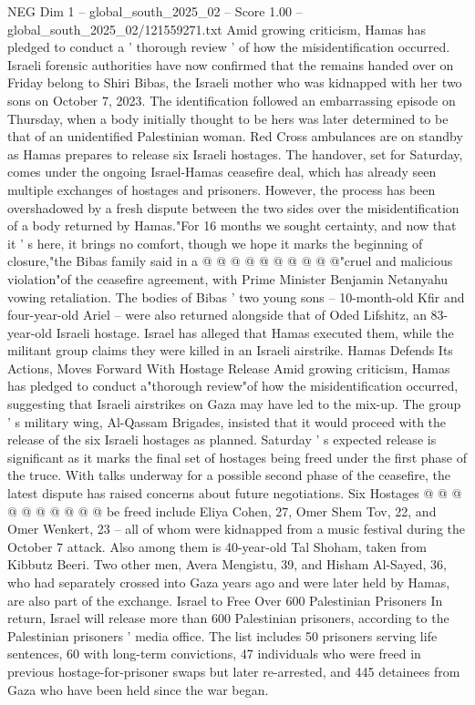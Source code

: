 \begin{textsample}{NEG Dim 1 – global\_south\_2025\_02 – Score 1.00 – global\_south\_2025\_02/121559271.txt}  \label{ex:f1_neg_034}
Amid growing criticism, Hamas has pledged to conduct a ' thorough review ' of how the misidentification occurred.
Israeli forensic authorities have now confirmed that the remains handed over on Friday belong to Shiri Bibas, the Israeli mother who was kidnapped with her two sons on October 7, 2023.
The identification followed an embarrassing episode on Thursday, when a body initially thought to be hers was later determined to be that of an unidentified Palestinian woman.
Red Cross ambulances are on standby as Hamas prepares to release six Israeli hostages.
The handover, set for Saturday, comes under the ongoing Israel-Hamas ceasefire deal, which has already seen multiple exchanges of hostages and prisoners.
However, the process has been overshadowed by a fresh dispute between the two sides over the misidentification of a body returned by Hamas."For 16 months we sought certainty, and now that it ' s here, it brings no comfort, though we hope it marks the beginning of closure,"the Bibas family said in a @ @ @ @ @ @ @ @ @ @"cruel and malicious violation"of the ceasefire agreement, with Prime Minister Benjamin Netanyahu vowing retaliation.
The bodies of Bibas ' two young sons -- 10-month-old Kfir and four-year-old Ariel -- were also returned alongside that of Oded Lifshitz, an 83-year-old Israeli hostage.
Israel has alleged that Hamas executed them, while the militant group claims they were killed in an Israeli airstrike.
Hamas Defends Its Actions, Moves Forward With Hostage Release Amid growing criticism, Hamas has pledged to conduct a"thorough review"of how the misidentification occurred, suggesting that Israeli airstrikes on Gaza may have led to the mix-up.
The group ' s military wing, Al-Qassam Brigades, insisted that it would proceed with the release of the six Israeli hostages as planned.
Saturday ' s expected release is significant as it marks the final set of hostages being freed under the first phase of the truce.
With talks underway for a possible second phase of the ceasefire, the latest dispute has raised concerns about future negotiations.
Six Hostages @ @ @ @ @ @ @ @ @ @ be freed include Eliya Cohen, 27, Omer Shem Tov, 22, and Omer Wenkert, 23 -- all of whom were kidnapped from a music festival during the October 7 attack.
Also among them is 40-year-old Tal Shoham, taken from Kibbutz Beeri.
Two other men, Avera Mengistu, 39, and Hisham Al-Sayed, 36, who had separately crossed into Gaza years ago and were later held by Hamas, are also part of the exchange.
Israel to Free Over 600 Palestinian Prisoners In return, Israel will release more than 600 Palestinian prisoners, according to the Palestinian prisoners ' media office.
The list includes 50 prisoners serving life sentences, 60 with long-term convictions, 47 individuals who were freed in previous hostage-for-prisoner swaps but later re-arrested, and 445 detainees from Gaza who have been held since the war began.

\end{textsample}
